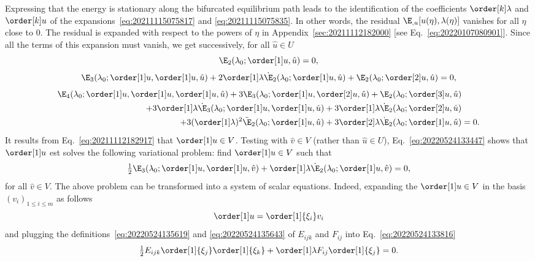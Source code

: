 Expressing that the energy is stationary along the bifurcated equilibrium path leads to the identification of the
coefficients $\order[k]\lambda$ and $\order[k]u$ of the expansions~\eqref{eq:20211115075817} and
\eqref{eq:20211115075835}. In other words, the residual $\E_{, u} [u(\eta), \lambda(\eta)]$ vanishes for all $\eta$
close to $0$. The residual is expanded with respect to the powers of $\eta$ in Appendix~\ref{sec:20211112182000} [see
Eq.~\eqref{eq:20220107080901}]. Since all the terms of this expansion must vanish, we get successively, for all
$\hat{u} \in U$
\begin{equation}
  \label{eq:20211112182917}
  \E_2(\lambda_0; \order[1]u, \hat{u}) = 0,
\end{equation}
\begin{equation}
  \label{eq:20220524133447}
  \E_3(\lambda_0; \order[1]u, \order[1]u, \hat{u}) + 2\order[1]\lambda\dot{\E}_2(\lambda_0; \order[1]u, \hat{u}) + \E_2(\lambda_0; \order[2]u, \hat{u}) = 0,
\end{equation}
\begin{equation}
  \label{eq:20220708060436}
  \begin{aligned}[b]
    \E_4(\lambda_0; \order[1]u, \order[1]u, \order[1]u, \hat{u}) + 3\E_3(\lambda_0; \order[1]u, \order[2]u, \hat{u}) + \E_2(\lambda_0; \order[3]u, \hat{u})&\\
    + 3\order[1]\lambda\dot{\E}_3(\lambda_0; \order[1]u, \order[1]u, \hat{u}) + 3\order[1]\lambda\dot{\E}_2(\lambda_0;  \order[2]u, \hat{u})&\\
    + 3(\order[1]\lambda)^2\ddot{\E}_2(\lambda_0; \order[1]u, \hat{u}) + 3\order[2]\lambda\dot{\E}_2(\lambda_0; \order[1]u, \hat{u}) & = 0.
  \end{aligned}
\end{equation}
It results from Eq.~\eqref{eq:20211112182917} that $\order[1]u \in V$. Testing with $\hat{v} \in V$ (rather than
$\hat{u} \in U$), Eq.~\eqref{eq:20220524133447} shows that $\order[1]u$ est solves the following variational problem:
find $\order[1]u \in V$ such that
\begin{equation}
  \label{eq:20220524133816}
  \tfrac{1}{2} \E_3(\lambda_0; \order[1]u, \order[1]u, \hat{v}) + \order[1]\lambda\dot{\E}_2(\lambda_0; \order[1]u, \hat{v}) = 0,
\end{equation}
for all $\hat{v} \in V$. The above problem can be transformed into a system of scalar equations. Indeed, expanding the
$\order[1]u \in V$ in the basis $(v_i)_{1 \leq i \leq m}$ as follows
\begin{equation}
  \label{eq:20220524133944}
  \order[1]u = \order[1]{\xi_i} v_i
\end{equation}
and plugging the definitions~\eqref{eq:20220524135619} and
\eqref{eq:20220524135643} of $E_{ijk}$ and $F_{ij}$ into
Eq.~\eqref{eq:20220524133816}
\begin{equation}
  \label{eq:20220524135036}
  \tfrac{1}{2} E_{ijk} \order[1]{\xi_j} \order[1]{\xi_k} + \order[1]\lambda F_{ij} \order[1]{\xi_j} = 0.
\end{equation}


